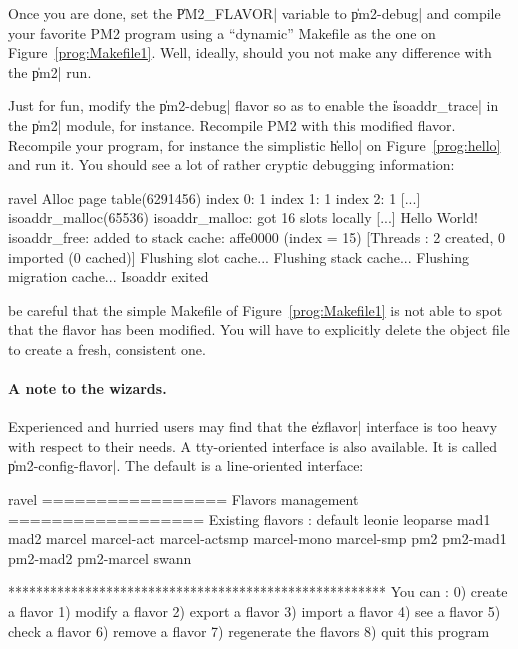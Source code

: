 Once you are done, set the \|PM2_FLAVOR| variable to \|pm2-debug| and
compile your favorite PM2 program using a
``dynamic'' Makefile as the one on Figure~\ref{prog:Makefile1}. Well,
ideally, should you not make any difference with the \|pm2| run. 

Just for fun, modify the \|pm2-debug| flavor so as to enable the
\|isoaddr_trace| in the \|pm2| module, for instance. Recompile PM2
with this modified flavor. Recompile your program, for instance the
simplistic \|hello| on Figure~\ref{prog:hello} and run it. You should
see a lot of rather cryptic debugging information:
\begin{shell}
ravel%
Alloc page table(6291456)
index 0: 1
index 1: 1
index 2: 1      
[...]
isoaddr_malloc(65536)
isoaddr_malloc: got 16 slots locally
[...]
Hello World!
isoaddr_free: added to stack cache: affe0000 (index = 15)
[Threads : 2 created, 0 imported (0 cached)]
Flushing slot cache...
Flushing stack cache...
Flushing migration cache...
Isoaddr exited
\end{shell}

\begin{warning}
  be careful that the simple Makefile of Figure~\ref{prog:Makefile1}
  is not able to spot that the flavor has been modified. You will have
  to explicitly delete the object file to create a fresh, consistent
  one. 
\end{warning}

\paragraph{A note to the wizards.}

Experienced and hurried users may find that the \|ezflavor| interface is
too heavy with respect to their needs. A tty-oriented  interface is
also available. It is called \|pm2-config-flavor|. The default is a 
line-oriented interface:
\begin{shell}
ravel%
================= Flavors management ==================
Existing flavors :
default leonie leoparse mad1 mad2 
marcel marcel-act marcel-actsmp marcel-mono marcel-smp 
pm2 pm2-mad1 pm2-mad2 pm2-marcel swann 

******************************************************
You can :
 0) create a flavor
 1) modify a flavor
 2) export a flavor
 3) import a flavor
 4) see    a flavor
 5) check  a flavor
 6) remove a flavor
 7) regenerate the flavors
 8) quit this program
\end{shell}

